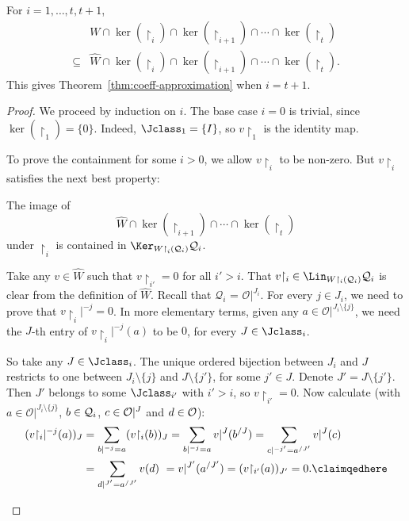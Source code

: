 \begin{lemma}\label{lem:coeff-approximation}
    For $i = 1, \dots, t, t+1$,
    \begin{align*}
        &W \cap \ker(\restriction_i) \cap \ker(\restriction_{i+1}) \cap \cdots \cap \ker(\restriction_t) \\
        \subseteq{} &\widehat W \cap \ker(\restriction_i) \cap \ker(\restriction_{i+1}) \cap \cdots \cap \ker(\restriction_t).
    \end{align*}
    This gives Theorem~\ref{thm:coeff-approximation} when $i = t+1$.
\end{lemma}

\begin{proof}
We proceed by induction on $i$.
The base case $i = 0$ is trivial, since $\ker(\restriction_1) = \{0\}$. Indeed, $\Jclass_1=\{I\}$, so $v{\restriction_1}$ is the identity map.

To prove the containment for some $i>0$, 
we allow $v {\restriction_i}$ to be non-zero.
But $v {\restriction_i}$ satisfies the next best property:
\begin{claim}
  The image of \[
        \widehat W \cap \ker(\restriction_{i+1}) \cap \cdots \cap \ker(\restriction_t)
    \] under $\restriction_{i}$ 
    is contained in $\Ker_{W {\restriction}_{i} (\mathcal{Q}_{i})} \mathcal{Q}_{i}$. 
\end{claim}
\begin{claimproof}
    Take any $v \in \widehat W$ such that  $v {\restriction_{i'}} = 0$ for all $i'>i$.
    That $v {\restriction_{i}} \in \Lin_{W{\restriction_{i}}(\mathcal{Q}_{i})} \mathcal{Q}_{i}$ is clear from the definition of $\widehat W$.
    Recall that $\mathcal{Q}_{i}$ = $\mathcal{O}|^{J_{i}}$.
    For every $j \in J_{i}$,
    we need to prove that $v {\restriction_{i}} |^{-j} = 0$. In more elementary terms, given any $a\in\mathcal{O}|^{J_{i}\setminus\{j\}}$, we need the $J$-th entry of $v {\restriction_{i}} |^{-j}(a)$ to be $0$, for every $J\in \Jclass_i$.
    
    So take any $J \in \Jclass_{i}$.
    The unique ordered bijection between $J_{i}$ and $J$ restricts to one between $J_{i} \setminus \{j\}$ and $J \setminus \{j'\}$, for some $j'\in J$. Denote $J'=J \setminus \{j'\}$.
    Then $J'$ belongs to some $\Jclass_{i'}$ with $i' > i $,
    so $v {\restriction_{i'}} = 0$. Now calculate (with $a\in\mathcal{O}|^{J_{i}\setminus\{j\}}$, $b\in{\cal Q}_i$, $c\in {\cal O}|^J$ and $d\in\cal O$):
\begin{align*}
	(v{\restriction_i}|^{-j}(a))_J &= \sum_{b|^{-j}=a}(v{\restriction_i}(b))_J
	= \sum_{b|^{-j}=a}v|^J(b^{/J}) 
	= \sum_{c|^{-j'}=a^{/J'}}v|^J(c) \\
	&= \sum_{d|^{J'}=a^{/J'}}v(d)
	\,\, = v|^{J'}(a^{/J'}) = (v{\restriction_{i'}}(a))_{J'} = 0.
    \claimqedhere
\end{align*}    
\end{claimproof}


\end{proof}
